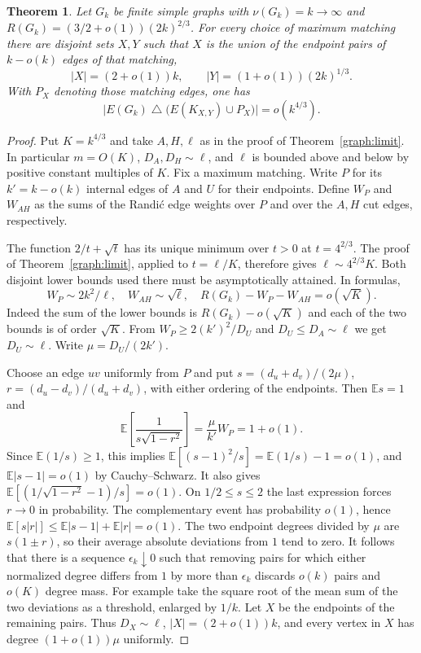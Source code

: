 \documentclass[11pt]{article}
\newtheorem{theorem}{Theorem}[section]
\theoremstyle{remark}\newtheorem{remark}[theorem]{Remark}
\begin{document}
\begin{theorem}\label{graph:stability}
Let $G_k$ be finite simple graphs with $\nu(G_k)=k\to\infty$ and
$R(G_k)=(3/2+o(1))(2k)^{2/3}$. For every choice of maximum matching
there are disjoint sets $X,Y$ such that $X$ is the union of the
endpoint pairs of $k-o(k)$ edges of that matching,
\[
 |X|=(2+o(1))k,\qquad |Y|=(1+o(1))(2k)^{1/3}.
\]
With $P_X$ denoting those matching edges, one has
\[
 \bigl|E(G_k)\mathbin{\triangle}
       \bigl(E(K_{X,Y})\cup P_X\bigr)\bigr|=o(k^{4/3}).
\]
\end{theorem}
\begin{proof}
Put $K=k^{4/3}$ and take $A,H,\ell$ as in the proof of
Theorem~\ref{graph:limit}. In particular $m=O(K)$,
$D_A,D_H\sim\ell$, and $\ell$ is bounded above and below by positive
constant multiples of $K$. Fix a maximum matching. Write $P$ for its
$k'=k-o(k)$ internal edges of $A$ and $U$ for their endpoints. Define
$W_P$ and $W_{AH}$ as the sums of the Randi\'c edge weights over $P$
and over the $A,H$ cut edges, respectively.

The function $2/t+\sqrt{t}$ has its unique minimum over $t>0$ at
$t=4^{2/3}$. The proof of Theorem~\ref{graph:limit}, applied to
$t=\ell/K$, therefore gives $\ell\sim4^{2/3}K$. Both disjoint lower
bounds used there must be asymptotically attained. In formulas,
\begin{equation}\label{graph:saturation}
 W_P\sim 2k^2/\ell,\quad W_{AH}\sim\sqrt{\ell},\quad
 R(G_k)-W_P-W_{AH}=o(\sqrt K).
\end{equation}
Indeed the sum of the lower bounds is $R(G_k)-o(\sqrt K)$
and each of the two bounds is of order $\sqrt K$.
From $W_P\ge2(k')^2/D_U$ and $D_U\le D_A\sim\ell$ we get
$D_U\sim\ell$. Write $\mu=D_U/(2k')$.

Choose an edge $uv$ uniformly from $P$ and put
$s=(d_u+d_v)/(2\mu)$, $r=(d_u-d_v)/(d_u+d_v)$, with either ordering of
the endpoints. Then $\mathbb E s=1$ and
\[
 \mathbb E\!\left[\frac{1}{s\sqrt{1-r^2}}\right]
      =\frac{\mu}{k'}W_P=1+o(1).
\]
Since $\mathbb E(1/s)\ge1$, this implies
$\mathbb E[(s-1)^2/s]=\mathbb E(1/s)-1=o(1)$, and
$\mathbb E|s-1|=o(1)$ by Cauchy--Schwarz.
It also gives $\mathbb E[(1/\sqrt{1-r^2}-1)/s]=o(1)$.
On $1/2\le s\le 2$ the last expression forces $r\to0$ in probability.
The complementary event has probability $o(1)$, hence
$\mathbb E[s|r|]\le\mathbb E|s-1|+\mathbb E|r|=o(1)$.
The two endpoint degrees divided by $\mu$ are $s(1\pm r)$, so their
average absolute deviations from $1$ tend to zero. It follows
that there is a sequence $\epsilon_k\downarrow0$ such that removing
pairs for which either normalized degree differs from $1$ by more
than $\epsilon_k$ discards $o(k)$ pairs and $o(K)$ degree mass.
For example take the square root of the mean sum of the two
deviations as a threshold, enlarged by $1/k$.
Let $X$ be the endpoints of the remaining pairs. Thus $D_X\sim\ell$,
$|X|=(2+o(1))k$, and every vertex in $X$ has degree $(1+o(1))\mu$
uniformly.


\end{proof}
\end{document}
